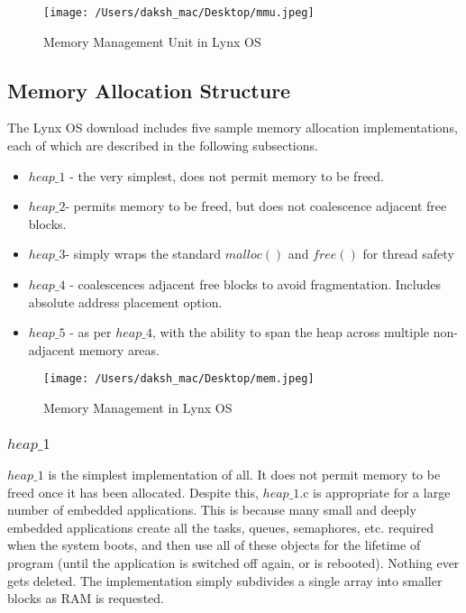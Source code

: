 \documentclass[12pt]{article}
\begin{document}
\begin{figure}[H]
	\centering
	\texttt{[image: /Users/daksh\_mac/Desktop/mmu.jpeg]}
	\caption[About memory]{Memory Management Unit in Lynx OS}
	\label{fig:mmu}	
\end{figure}

\subsection{Memory Allocation Structure}
The Lynx OS download includes five sample memory allocation implementations, each of which are described in the following subsections.

\begin{itemize}
	\item $heap\_1$ - the very simplest, does not permit memory to be freed.
	
	
	\item $heap\_2 $- permits memory to be freed, but does not coalescence adjacent free blocks.
			
	\item $heap\_3 $- simply wraps the standard $malloc()$ and $free()$ for thread safety
	
	\item $heap\_4$ - coalescences adjacent free blocks to avoid fragmentation. Includes absolute address placement option.
	
	\item $heap\_5$ - as per $heap\_4$, with the ability to span the heap across multiple non-adjacent memory areas.


\end{itemize}


\begin{figure}[H]
	\centering
	\texttt{[image: /Users/daksh\_mac/Desktop/mem.jpeg]}
	\caption[About memory]{Memory Management in Lynx OS}
	\label{fig:mem}	
\end{figure}


\subsubsection{$heap\_1$}	

$heap\_1$ is the simplest implementation of all. It does not permit memory to be freed once it has been allocated. Despite this, $heap\_1$.c is appropriate for a large number of embedded applications. This is because many small and deeply embedded applications create all the tasks, queues, semaphores, etc. required when the system boots, and then use all of these objects for the lifetime of program (until the application is switched off again, or is rebooted). Nothing ever gets deleted. The implementation simply subdivides a single array into smaller blocks as RAM is requested.\\
\end{document}
